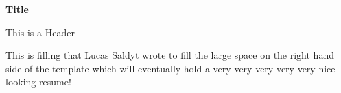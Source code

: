 \documentclass[letterpaper,11pt]{article}
\begin{document}
\begin{center}
\textbf{\Large Title}
\end{center}
\begin{minipage}{0.1\textwidth}
    This is a Header
\end{minipage}
\hspace{0.1\textwidth}
\begin{minipage}{0.8\textwidth}
    This is filling that Lucas Saldyt wrote to fill the large space on the right hand side of the template which will eventually hold a very very very very very nice looking resume!
\end{minipage}
\end{document}
